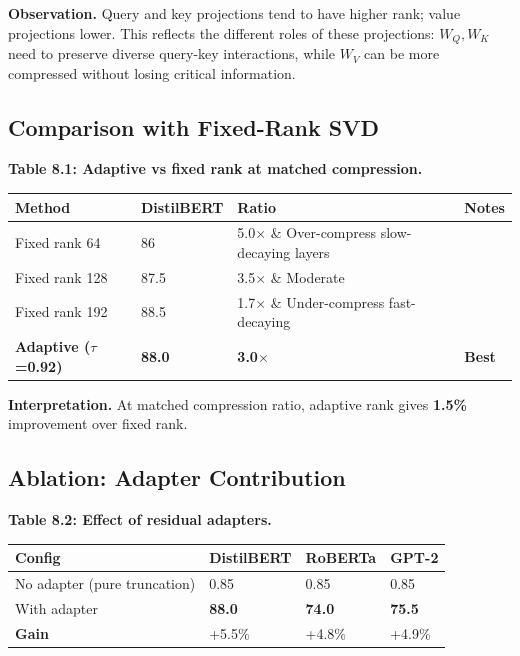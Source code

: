 \textbf{Observation.} Query and key projections tend to have higher rank; value 
projections lower. This reflects the different roles of these projections: 
$W_Q, W_K$ need to preserve diverse query-key interactions, while $W_V$ can 
be more compressed without losing critical information.

\subsection{Comparison with Fixed-Rank SVD}

\textbf{Table 8.1: Adaptive vs fixed rank at matched compression.}

\begin{table}[H]
\centering
\small
\begin{tabular}{llll}
\toprule
\textbf{Method} & \textbf{DistilBERT} & \textbf{Ratio} & \textbf{Notes} \\
\midrule
Fixed rank 64 & 86 & 5.0$\times$ \& Over-compress slow-decaying layers \\
Fixed rank 128 & 87.5 & 3.5$\times$ \& Moderate \\
Fixed rank 192 & 88.5 & 1.7$\times$ \& Under-compress fast-decaying \\
\textbf{Adaptive ($\tau$=0.92)} & \textbf{88.0} & \textbf{3.0$\times$} & \textbf{Best} \\
\bottomrule
\end{tabular}
\end{table}

\textbf{Interpretation.} At matched compression ratio, adaptive rank gives 
\textbf{1.5\%} improvement over fixed rank.

\subsection{Ablation: Adapter Contribution}

\textbf{Table 8.2: Effect of residual adapters.}

\begin{table}[H]
\centering
\small
\begin{tabular}{llll}
\toprule
\textbf{Config} & \textbf{DistilBERT} & \textbf{RoBERTa} & \textbf{GPT-2} \\
\midrule
No adapter (pure truncation) & 0.85 & 0.85 & 0.85 \\
With adapter & \textbf{88.0} & \textbf{74.0} & \textbf{75.5} \\
\textbf{Gain} & +5.5\% & +4.8\% & +4.9\% \\
\bottomrule
\end{tabular}
\end{table}

